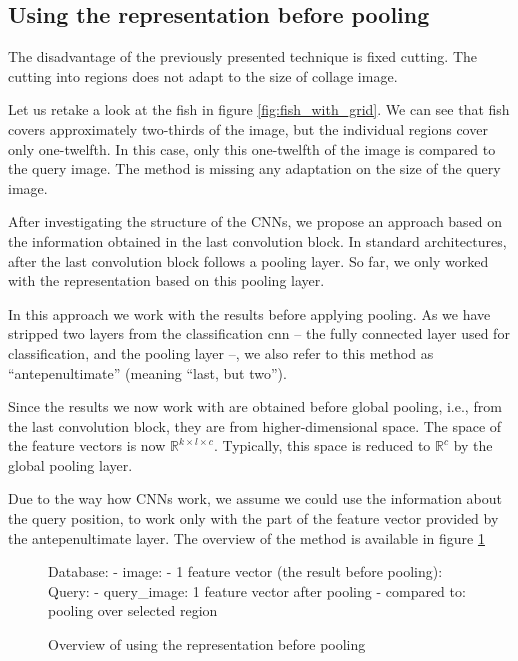 \subsection{Using the representation before pooling}

The disadvantage of the previously presented technique is fixed cutting. The cutting into regions does not adapt to the size of collage image. 

Let us retake a look at the fish in figure \ref{fig:fish_with_grid}. We can see that fish covers approximately two-thirds of the image, but the individual regions cover only one-twelfth. In this case, only this one-twelfth of the image is compared to the query image. The method is missing any adaptation on the size of the query image.

After investigating the structure of the CNNs, we propose an approach based on the information obtained in the last convolution block. In standard architectures, after the last convolution block follows a pooling layer. So far, we only worked with the representation based on this pooling layer.

In this approach we work with the results before applying pooling. As we have stripped two layers from the classification \acrshort{cnn} -- the fully connected layer used for classification, and the pooling layer --, we also refer to this method as ``antepenultimate'' (meaning ``last, but two'').

Since the results we now work with are obtained before global pooling, i.e., from the last convolution block, they are from higher-dimensional space. The space of the feature vectors is now $\mathbb{R}^{k\times l \times c}$. Typically, this space is reduced to $\mathbb{R}^c$ by the global pooling layer.

Due to the way how CNNs work, we assume we could use the information about the query position, to work only with the part of the feature vector provided by the antepenultimate layer. The overview of the method is available in figure \ref{fig:antepenultimate_overview}

\begin{figure}
\centering
\begin{boxedverbatim}
Database:
    - image:
        - 1 feature vector (the result before pooling):
Query:
    - query_image: 1 feature vector after pooling
    - compared to: pooling over selected region
\end{boxedverbatim}
\caption{Overview of using the representation before pooling}
\label{fig:antepenultimate_overview}
\end{figure}


